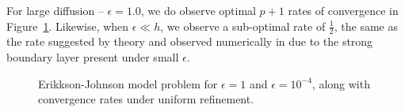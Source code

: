 \documentclass[final,leqno]{siamltex}
\begin{document}
For large diffusion -- $\epsilon = 1.0$, we do observe optimal $p+1$ rates of convergence in Figure~\ref{fig:erikkson2}.  Likewise, when $\epsilon \ll h$, we observe a sub-optimal rate of $\frac{1}{2}$, the same as the rate suggested by theory and observed numerically in \cite{broersenStevenson} due to the strong boundary layer present under small $\epsilon$.  
\begin{figure}[!h]
\centering
{}
\caption{Erikkson-Johnson model problem for $\epsilon = 1$ and $\epsilon = 10^{-4}$, along with convergence rates under uniform refinement.}
\label{fig:erikkson2}
\end{figure}
\end{document}
